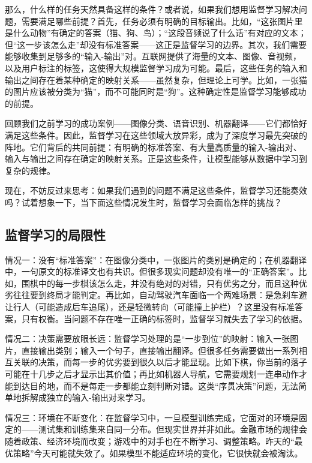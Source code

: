\documentclass[lang=cn,zihao=-4,a4paper,fontset=windows]{beautybook}
\begin{document}
那么，什么样的任务天然具备这样的条件？或者说，如果我们想用监督学习解决问题，需要满足哪些前提？首先，任务必须有明确的目标输出。比如，“这张图片里是什么动物”有确定的答案（猫、狗、鸟）；“这段音频说了什么话”有对应的文本；但“这一步该怎么走”却没有标准答案——这正是监督学习的边界。其次，我们需要能够收集到足够多的“输入-输出”对。互联网提供了海量的文本、图像、音视频，以及用户标注的标签，这使得大规模监督学习成为可能。最后，这些任务的输入和输出之间存在着某种确定的映射关系——虽然复杂，但理论上可学。比如，一张猫的图片应该被分类为“猫”，而不可能同时是“狗”。这种确定性是监督学习能够成功的前提。

回顾我们之前学习的成功案例——图像分类、语音识别、机器翻译——它们都恰好满足这些条件。因此，监督学习在这些领域大放异彩，成为了深度学习最先突破的阵地。它们背后的共同前提：有明确的标准答案、有大量高质量的输入-输出对、输入与输出之间存在确定的映射关系。正是这些条件，让模型能够从数据中学习到复杂的规律。
\begin{fancybox}
    现在，不妨反过来思考：如果我们遇到的问题不满足这些条件，监督学习还能奏效吗？试着想象一下，当下面这些情况发生时，监督学习会面临怎样的挑战？
\end{fancybox}

\subsection{监督学习的局限性}

情况一：没有“标准答案”：在图像分类中，一张图片的类别是确定的；在机器翻译中，一句原文的标准译文也有共识。但很多现实问题却没有唯一的“正确答案”。比如，围棋中的每一步棋该怎么走，并没有绝对的对错，只有优劣之分，而且这种优劣往往要到终局才能判定。再比如，自动驾驶汽车面临一个两难场景：是急刹车避让行人（可能造成后车追尾），还是轻微转向（可能撞上护栏）？这里没有标准答案，只有权衡。当问题不存在唯一正确的标签时，监督学习就失去了学习的依据。

情况二：决策需要放眼长远：监督学习处理的是“一步到位”的映射：输入一张图片，直接输出类别；输入一个句子，直接输出翻译。但很多任务需要做出一系列相互关联的决策，而每一步的优劣要到很久以后才能显现。比如下棋，你当前的落子可能在十几步之后才显示出其价值；再比如机器人导航，它需要规划一连串动作才能到达目的地，而不是每走一步都能立刻判断对错。这类“序贯决策”问题，无法简单地拆解成独立的输入-输出对来学习。

情况三：环境在不断变化：在监督学习中，一旦模型训练完成，它面对的环境是固定的——测试集和训练集来自同一分布。但现实世界并非如此。金融市场的规律会随着政策、经济环境而改变；游戏中的对手也在不断学习、调整策略。昨天的“最优策略”今天可能就失效了。如果模型不能适应环境的变化，它很快就会被淘汰。
\end{document}
